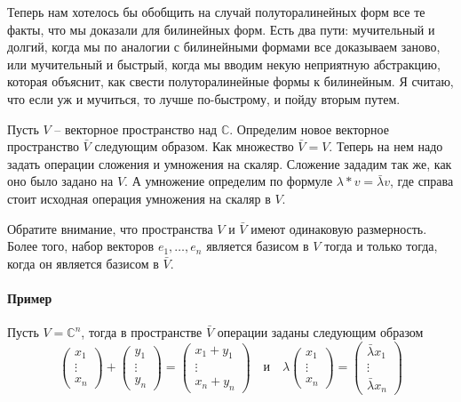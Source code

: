 Теперь нам хотелось бы обобщить на случай полуторалинейных форм все те факты, что мы доказали для билинейных форм.
Есть два пути: мучительный и долгий, когда мы по аналогии с билинейными формами все доказываем заново, или мучительный и быстрый, когда мы вводим некую неприятную абстракцию, которая объяснит, как свести полуторалинейные формы к билинейным.
Я считаю, что если уж и мучиться, то лучше по-быстрому, и пойду вторым путем.

\begin{definition}
Пусть $V$ -- векторное пространство над $\mathbb C$.
Определим новое векторное пространство $\bar V$ следующим образом.
Как множество $\bar V = V$.
Теперь на нем надо задать операции сложения и умножения на скаляр.
Сложение зададим так же, как оно было задано на $V$.
А умножение определим по формуле $\lambda *v = \bar \lambda v$, где справа стоит исходная операция умножения на скаляр в $V$.
\end{definition}

Обратите внимание, что пространства $V$ и $\bar V$ имеют одинаковую размерность.
Более того, набор векторов $e_1,\ldots,e_n$ является базисом в $V$ тогда и только тогда, когда он является базисом в $\bar V$.

\paragraph{Пример}

Пусть $V = \mathbb C^n$, тогда в пространстве $\bar V$ операции заданы следующим образом
\[
\begin{pmatrix}
{x_1}\\{\vdots}\\{x_n}
\end{pmatrix}
+
\begin{pmatrix}
{y_1}\\{\vdots}\\{y_n}
\end{pmatrix}
=
\begin{pmatrix}
{x_1 + y_1}\\{\vdots}\\{x_n + y_n}
\end{pmatrix}
\quad\text{и}\quad
\lambda
\begin{pmatrix}
{x_1}\\{\vdots}\\{x_n}
\end{pmatrix}
=
\begin{pmatrix}
{\bar \lambda x_1}\\{\vdots}\\{\bar \lambda x_n}
\end{pmatrix}
\]

